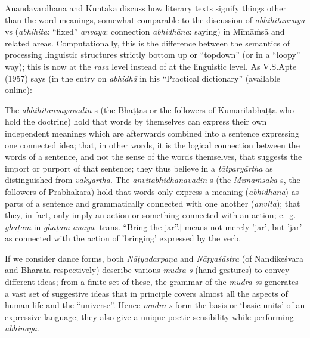 Ānandavardhana and Kuntaka discuss how literary texts signify things other than the word meanings, somewhat comparable to the discussion of \textsl{abhihitānvaya} vs  (\textsl{abhihita}: “fixed” \textsl{anvaya}: connection \textsl{abhidhāna}: saying) in Mīmāṁsā and related areas. Computationally, this is the difference between the semantics of processing linguistic structures strictly bottom up or “topdown” (or in a “loopy” way); this is now at the \textsl{rasa} level instead of at the linguistic level. As V.S.Apte (1957) says (in the entry on \textsl{abhidhā} in his “Practical dictionary'' (available online):
\begin{myquote}
The \textsl{abhihitānvayavādin-}s (the Bhāṭṭas or the followers of Kumārilabhaṭṭa who hold the doctrine) hold that words by themselves can express their own independent meanings which are afterwards combined into a sentence expressing one connected idea; that, in other words, it is the logical connection between the words of a sentence, and not the sense of the words themselves, that suggests the import or purport of that sentence; they thus believe in a \textsl{tātparyārtha} as distinguished from \textsl{vākyārtha}. The \textsl{anvitābhidhānavādin-}s (the \textsl{Mīmāṁsaka-}s, the followers of Prabhākara) hold that words only express a meaning (\textsl{abhidhāna}) as parts of a sentence and grammatically connected with one another (\textsl{anvita}); that they, in fact, only imply an action or something connected with an action; e.~g. \textsl{ghaṭam} in \textsl{ghaṭam ānaya} [trans. “Bring the jar”.] means not merely 'jar', but 'jar' as connected with the action of 'bringing' expressed by the verb.
\end{myquote}

If we consider dance forms, both \textsl{Nāṭyadarpaṇa} and \textsl{Nāṭyaśāstra} (of Nandikeśvara and Bharata respectively) describe various \textsl{mudrā-s} (hand gestures) to convey different ideas; from a finite set of these, the grammar of the \textsl{mudrā-s}s generates a vast set of suggestive ideas that in principle covers almost all the aspects of human life and the “universe”. Hence \textsl{mudrā-s} form the basis or ‘basic units’ of an expressive language; they also give a unique poetic sensibility while performing \textsl{abhinaya}.

